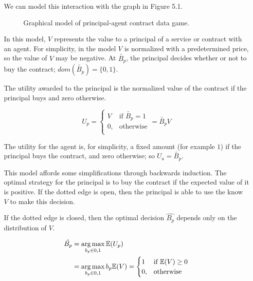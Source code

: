 \documentclass[../thesis.tex]{subfiles}
\begin{document}
We can model this interaction with the graph in Figure 5.1.

\begin{figure}
  \label{fig:principal-agent}
\begin{center}
\end{center}
\caption{Graphical model of principal-agent contract data game.}
\end{figure}

In this model, $V$ represents the value to a principal
of a service or contract with an agent.
For simplicity, in the model $V$ is normalized
with a predetermined price, so the value of $V$
may be negative.
At $\tilde{B_p}$, the principal decides whether or not to buy
the contract; $dom(\tilde{B_p}) = \{0,1\}$.

The utility awarded to the principal is the normalized
value of the contract if the principal buys and zero
otherwise.

$$U_p = \begin{cases}
               V & \text{if } \tilde{B_p} = 1 \\
               0, & \text{otherwise}\\
\end{cases} = \tilde{B_p} V$$

The utility for the agent is, for simplicity, 
a fixed amount (for example $1$) if the principal buys the contract,
and zero otherwise; so $U_a = \tilde{B_p}$.

This model affords some simplifications through backwards 
induction.
The optimal strategy for the principal is 
to buy the contract if the expected value of it is positive.
If the dotted edge is open, then the principal is able to use
the know $V$ to make this decision.

If the dotted edge is closed, then the optimal
decision $\hat{B_p}$ depends only on
the distribution of $V$.

\begin{equation}
  \begin{split}
    \hat{B_p} & = \operatorname*{arg\,max}_{b_p \in {0,1}} \mathbb{E}(U_p) \\
      & = \operatorname*{arg\,max}_{b_p \in {0,1}} b_p \mathbb{E}(V) = \begin{cases}
      1 & \text{if } \mathbb{E}(V) \geq 0 \\
      0, & \text{otherwise}\\
    \end{cases}
  \end{split}
\end{equation}
\end{document}
